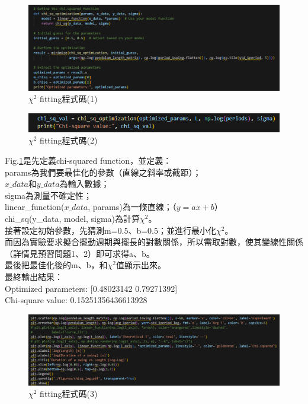 \documentclass[12pt,a4paper]{article}
\begin{document}
\begin{CJK}{UTF8}{bkai}
\begin{figure}[h]
    \centering
    \includegraphics[width=1\linewidth]{chi1.png}
    \caption{$\chi^2$ fitting程式碼(1)}
    \label{fig:chi1}
\end{figure}
\begin{figure}[h]
    \centering
    \includegraphics[width=1\linewidth]{chi5.png}
    \caption{$\chi^2$ fitting程式碼(2)}
    \label{fig:chi5}
\end{figure}
Fig.\ref{fig:chi1}是先定義chi-squared function，並定義：\\
params為我們要最佳化的參數（直線之斜率或截距）；\\
$x\_data$和$y\_data$為輸入數據；\\
sigma為測量不確定性；\\
linear\_function($x\_data$, \*params)為一條直線；（$y=ax+b$）\\
chi\_sq(y\_data, model, sigma)為計算$\chi^2$。\\
\indent 接著設定初始參數，先猜測m=0.5、b=0.5；並進行最小化$\chi^2$。\\
\indent 而因為實驗要求擬合擺動週期與擺長的對數關係，所以需取對數，使其變線性關係（詳情見預習問題1、2）即可求得a、b。\\
\indent 最後把最佳化後的m、b，和$\chi^2$值顯示出來。\\
\indent 最終輸出結果：\\
Optimized parameters: [0.48023142 0.79271392]\\
Chi-square value: 0.15251356436613928


\begin{figure}[h]
    \centering
    \includegraphics[width=1\linewidth]{chi2.png}
    \caption{$\chi^2$ fitting程式碼(3)}
    \label{fig:chi2}
\end{figure}


\end{CJK}
\end{document}

